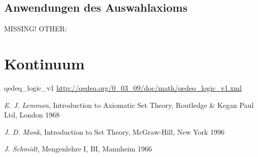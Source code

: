 \documentclass[a4paper,german,10pt,twoside]{book}
\theoremstyle{definition}
\theoremstyle{remark}
\begin{document}
\section{Anwendungen des Auswahlaxioms} \label{chapter6_section1} \hypertarget{chapter6_section1}{}
MISSING! OTHER: 



\chapter{Kontinuum} \label{chapter7} \hypertarget{chapter7}{}




\begin{thebibliography}{99}


 qedeq\_logic\_v1 \url{http://qedeq.org/0_03_09/doc/math/qedeq_logic_v1.xml}



 \emph{E. J. Lemmon}, Introduction to Axiomatic Set Theory, Routledge \& Kegan Paul Ltd, London 1968

 \emph{J. D. Monk}, Introduction to Set Theory, McGraw-Hill, New York 1996

 \emph{J. Schmidt}, Mengenlehre I, BI, Mannheim 1966

\end{thebibliography}
\backmatter

 \printindex
\end{document}
